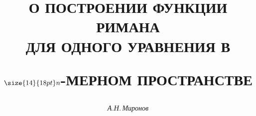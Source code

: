 






%





\newcommand{\tts}[1]{}







\setcounter{page}{78}















\author{\it А.Н.\,Миронов}




\title{О ПОСТРОЕНИИ ФУНКЦИИ РИМАНА\\


ДЛЯ ОДНОГО УРАВНЕНИЯ В


{$\size{14}{18pt}\selectfont{\protect n}$}-МЕРНОМ ПРОСТРАНСТВЕ}





\date{}




\pagestyle{plain} %







\maketitle


